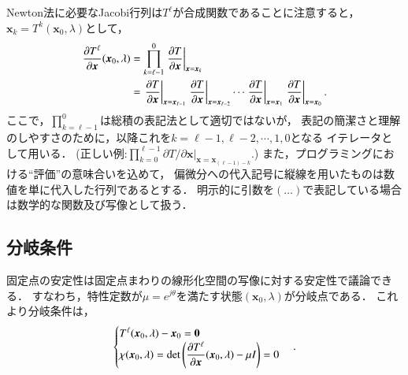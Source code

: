\documentclass[a4paper,dvipdfmx]{jsarticle}
\newcommand{\pdiff}[3]{
 \ifnum #1<1
 \text{Args[0] should be more than 1} \else{
 \ifnum #1=1 \displaystyle \frac{\partial #2}{\partial #3}\else
 \displaystyle \frac{\partial^{#1} #2}{\partial #3^{#1}}\fi
 }\fi
}
\begin{document}
Newton法に必要なJacobi行列は$T^\ell$が合成関数であることに注意すると，
$\bm{x}_k = T^k(\bm{x}_0, \lambda)$として，
\begin{align}
\begin{split}    
    \pdiff{1}{T^\ell}{\bm{x}}(\bm{x}_0, \lambda) &= 
    \prod_{k=\ell-1}^{0} \left.\pdiff{1}{T}{\bm{x}}\right|_{\bm{x}=\bm{x}_k}\\
    &= \left.\pdiff{1}{T}{\bm{x}}\right|_{\bm{x}=\bm{x}_{\ell-1}}
    \left.\pdiff{1}{T}{\bm{x}}\right|_{\bm{x}=\bm{x}_{\ell-2}}
    \cdots
    \left.\pdiff{1}{T}{\bm{x}}\right|_{\bm{x}=\bm{x}_1}
    \left.\pdiff{1}{T}{\bm{x}}\right|_{\bm{x}=\bm{x}_0}.
\end{split}
\label{eq:dTldx}
\end{align}
ここで，$\prod_{k=\ell-1}^{0}$は総積の表記法として適切ではないが，
表記の簡潔さと理解のしやすさのために，以降これを$k = \ell-1, \ell-2, \cdots, 1, 0$となる
イテレータとして用いる．
(正しい例:$\prod_{k=0}^{\ell-1}\partial T/\partial \bm{x}|_{\bm{x}=\bm{x}_{(\ell-1)-k}}$.)
また，プログラミングにおける``評価''の意味合いを込めて，
偏微分への代入記号に縦線を用いたものは数値を単に代入した行列であるとする．
明示的に引数を$(\ldots)$で表記している場合は数学的な関数及び写像として扱う．

\subsection{分岐条件}
固定点の安定性は固定点まわりの線形化空間の写像に対する安定性で議論できる．
すなわち，特性定数が$\mu=e^{j\theta}$を満たす状態$(\bm{x}_0, \lambda)$が分岐点である．
これより分岐条件は，
\begin{align}
\begin{cases}
    T^\ell(\bm{x}_0, \lambda) - \bm{x}_0 = \bm{0}\\
    \chi(\bm{x}_0, \lambda) = \mathrm{det}\left(\pdiff{1}{T^\ell}{\bm{x}}(\bm{x}_0, \lambda) - \mu I\right) = 0
\end{cases}.
\label{eq:bif_cond}
\end{align}
\end{document}
